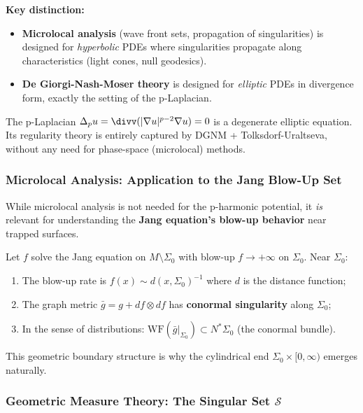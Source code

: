\begin{remark}
\textbf{Key distinction:}
\begin{itemize}
\item \textbf{Microlocal analysis} (wave front sets, propagation of singularities) is designed for \emph{hyperbolic} PDEs where singularities propagate along characteristics (light cones, null geodesics).
\item \textbf{De Giorgi-Nash-Moser theory} is designed for \emph{elliptic} PDEs in divergence form, exactly the setting of the p-Laplacian.
\end{itemize}
The p-Laplacian $\Delta_p u = \divv(|\nabla u|^{p-2}\nabla u) = 0$ is a degenerate elliptic equation. Its regularity theory is entirely captured by DGNM + Tolksdorf-Uraltseva, without any need for phase-space (microlocal) methods.
\end{remark}

\subsubsection{Microlocal Analysis: Application to the Jang Blow-Up Set}

While microlocal analysis is not needed for the p-harmonic potential, it \emph{is} relevant for understanding the \textbf{Jang equation's blow-up behavior} near trapped surfaces.

\begin{proposition}\label{prop:jang-microlocal}
Let $f$ solve the Jang equation on $M \setminus \Sigma_0$ with blow-up $f \to +\infty$ on $\Sigma_0$. Near $\Sigma_0$:
\begin{enumerate}
\item The blow-up rate is $f(x) \sim d(x, \Sigma_0)^{-1}$ where $d$ is the distance function;
\item The graph metric $\bar{g} = g + df \otimes df$ has \textbf{conormal singularity} along $\Sigma_0$;
\item In the sense of distributions: $\mathrm{WF}(\bar{g}|_{\Sigma_0}) \subset N^*\Sigma_0$ (the conormal bundle).
\end{enumerate}
This geometric boundary structure is why the cylindrical end $\Sigma_0 \times [0, \infty)$ emerges naturally.
\end{proposition}

\subsubsection{Geometric Measure Theory: The Singular Set $\mathcal{S}$}

